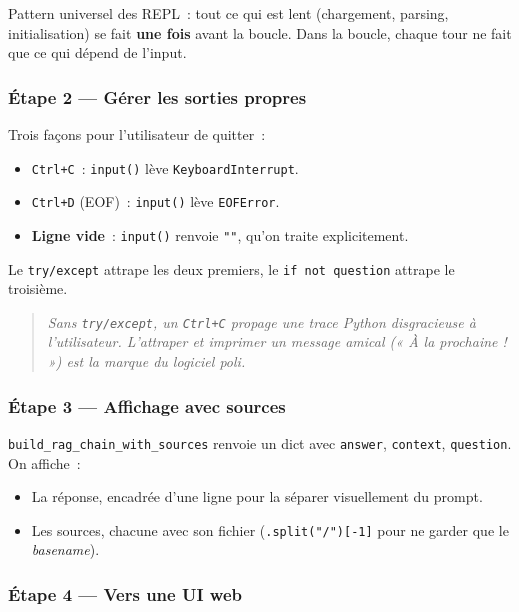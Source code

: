 \documentclass[11pt,a4paper]{article}
\begin{document}
Pattern universel des REPL~: tout ce qui est lent (chargement, parsing,
initialisation) se fait \textbf{une fois} avant la boucle. Dans la
boucle, chaque tour ne fait que ce qui dépend de l'input.

\subsubsection*{Étape 2 — Gérer les sorties propres}

Trois façons pour l'utilisateur de quitter~:

\begin{itemize}[leftmargin=*]
  \item \texttt{Ctrl+C}~: \texttt{input()} lève \texttt{KeyboardInterrupt}.
  \item \texttt{Ctrl+D} (EOF)~: \texttt{input()} lève \texttt{EOFError}.
  \item \textbf{Ligne vide}~: \texttt{input()} renvoie \texttt{""}, qu'on
        traite explicitement.
\end{itemize}

Le \texttt{try/except} attrape les deux premiers, le \texttt{if not
question} attrape le troisième.

\begin{quote}\itshape
Sans \texttt{try/except}, un \texttt{Ctrl+C} propage une trace Python
disgracieuse à l'utilisateur. L'attraper et imprimer un message
amical (« À la prochaine ! ») est la marque du logiciel poli.
\end{quote}

\subsubsection*{Étape 3 — Affichage avec sources}

\texttt{build\_rag\_chain\_with\_sources} renvoie un dict avec
\texttt{answer}, \texttt{context}, \texttt{question}. On affiche~:
\begin{itemize}[leftmargin=*]
  \item La réponse, encadrée d'une ligne pour la séparer visuellement
        du prompt.
  \item Les sources, chacune avec son fichier (\texttt{.split("/")[-1]}
        pour ne garder que le \emph{basename}).
\end{itemize}

\subsubsection*{Étape 4 — Vers une UI web}
\end{document}
